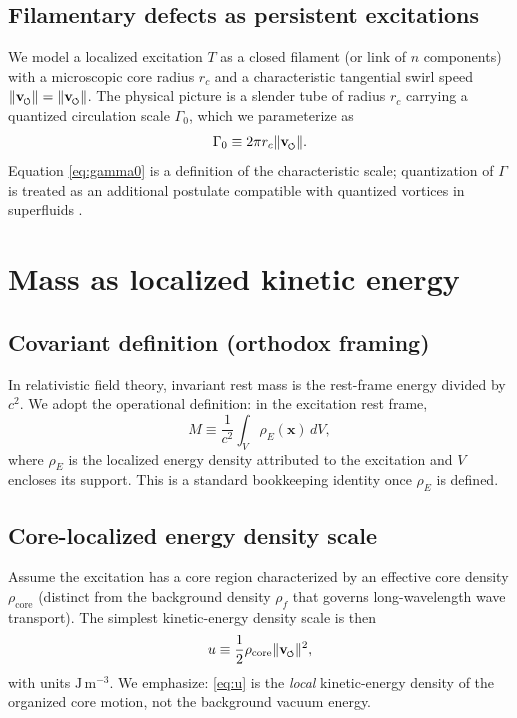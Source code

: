 \documentclass[11pt]{article}
\newcommand{\vswirl}{\mathbf{v}_{\mkern-2mu\scriptscriptstyle\boldsymbol{\circlearrowleft}}}
\newcommand{\vnorm}{\lVert \mathbf{v}_{\mkern-2mu\scriptscriptstyle\boldsymbol{\circlearrowleft}} \rVert}  %
\newcommand{\rhoF}{\rho_{\!f}}\newcommand{\rhof}{\rho_{\!f}}     %
\newcommand{\rhoE}{\rho_{\!E}}\newcommand{\rhoe}{\rho_{\!E}}                           %
\newcommand{\rc}{r_c}                                    %
\newcommand{\rhocore}{\rho_{\mathrm{core}}}
\theoremstyle{definition}
\theoremstyle{plain}
\theoremstyle{remark}
\begin{document}
        \subsection{Filamentary defects as persistent excitations}
            We model a localized excitation $T$ as a closed filament (or link of $n$ components) with a microscopic core radius $\rc$ and a characteristic tangential swirl speed $\vnorm=\lVert \vswirl\rVert$. The physical picture is a slender tube of radius $\rc$ carrying a quantized circulation scale $\Gamma_{0}$, which we parameterize as
            \begin{equation}
                \Gamma_{0}\equiv 2\pi \rc \vnorm.
                \label{eq:gamma0}
            \end{equation}
            Equation \eqref{eq:gamma0} is a definition of the characteristic scale; quantization of $\Gamma$ is treated as an additional postulate compatible with quantized vortices in superfluids \cite{Onsager1949,Feynman1955}.

        \section{Mass as localized kinetic energy}

        \subsection{Covariant definition (orthodox framing)}
            In relativistic field theory, invariant rest mass is the rest-frame energy divided by $c^2$. We adopt the operational definition: in the excitation rest frame,
            \begin{equation}
                M \equiv \frac{1}{c^2}\int_V \rhoE(\mathbf{x})\,dV,
                \label{eq:massfunctional}
            \end{equation}
            where $\rhoE$ is the localized energy density attributed to the excitation and $V$ encloses its support. This is a standard bookkeeping identity once $\rhoE$ is defined.

        \subsection{Core-localized energy density scale}
            Assume the excitation has a core region characterized by an effective core density $\rhocore$ (distinct from the background density $\rhoF$ that governs long-wavelength wave transport). The simplest kinetic-energy density scale is then
            \begin{equation}
                u \equiv \frac{1}{2}\rhocore \vnorm^2,
                \label{eq:u}
            \end{equation}
            with units $\mathrm{J\,m^{-3}}$. We emphasize: \eqref{eq:u} is the \emph{local} kinetic-energy density of the organized core motion, not the background vacuum energy.
\end{document}
